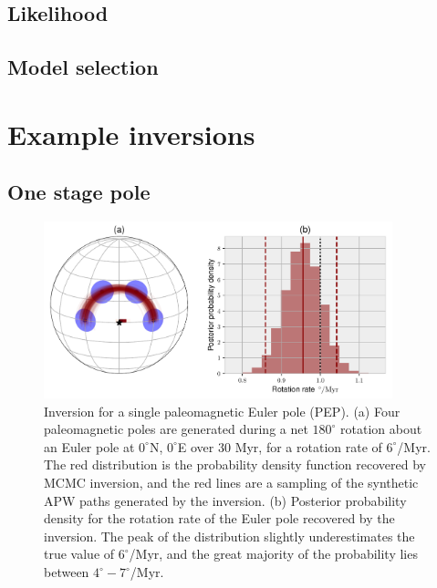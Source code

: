 \documentclass[preprint,12pt,authoryear]{elsarticle}
\begin{document}
\subsection{Likelihood}

\subsection{Model selection}

\section{Example inversions}
\label{sec:example_inversion}


\subsection{One stage pole}
\begin{figure}
\includegraphics[width=0.9\textwidth]{figures/synthetic/one_euler_pole.pdf}
\caption[Inversion for a single paleomagnetic Euler pole.]{Inversion for a single paleomagnetic Euler pole (PEP). (a) Four paleomagnetic poles are generated during a net $180^\circ$ rotation about an Euler pole at $0^\circ$N, $0^\circ$E over 30 Myr, for a rotation rate of $6^\circ$/Myr. The red distribution is the probability density function recovered by MCMC inversion, and the red lines are a sampling of the synthetic APW paths generated by the inversion. (b) Posterior probability density for the rotation rate of the Euler pole recovered by the inversion. The peak of the distribution slightly underestimates the true value of $6^\circ$/Myr, and the great majority of the probability lies between $4^\circ-7^\circ$/Myr. }
\label{fig:one_euler_pole}
\end{figure}
\end{document}
